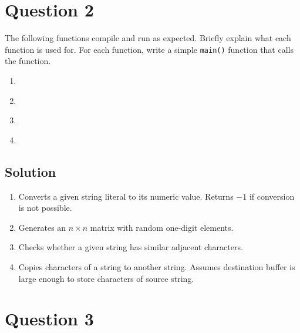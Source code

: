 \documentclass[12pt,letterpaper,twoside]{article}
\begin{document}
\newpage

\section*{Question 2}

The following functions compile and run as expected.
Briefly explain what each function is used for.
For each function, write a simple \texttt{main()} function that calls the function.

\lstset{language=c,tabsize=4}
\begin{enumerate}[label=(\alph*)]
\item \lstinline{}

\item \lstinline{}

\newpage
\item \lstinline{}

\item \lstinline{}

\end{enumerate}

\subsection*{Solution}

\lstset{language=c,tabsize=4}
\begin{enumerate}[label=(\alph*)]
\item
Converts a given string literal to its numeric value.
Returns $-1$ if conversion is not possible.


\item
Generates an $n \times n$ matrix with random one-digit elements.


\item
Checks whether a given string has similar adjacent characters.


\item
Copies characters of a string to another string.
Assumes destination buffer is large enough to store characters of source string.

\end{enumerate}

\section*{Question 3}
\end{document}
